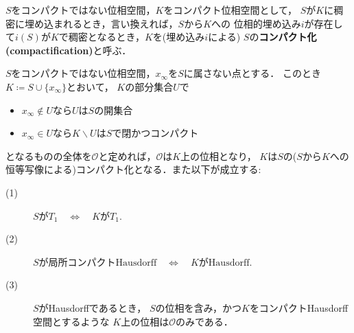 	\begin{screen}
		\begin{dfn}[コンパクト化]
			$S$をコンパクトではない位相空間，$K$をコンパクト位相空間として，
			$S$が$K$に稠密に埋め込まれるとき，言い換えれば，$S$から$K$への
			位相的埋め込み$i$が存在して$i(S)$が$K$で稠密となるとき，$K$を(埋め込み$i$による)
			$S$の{\bf コンパクト化}
			{\bf (compactification)}と呼ぶ．
		\end{dfn}
	\end{screen}
	
	\begin{screen}
		\begin{thm}
		\label{thm:Alexandroff_compactification}
			$S$をコンパクトではない位相空間，$x_\infty$を$S$に属さない点とする．
			このとき$K \coloneqq S \cup \{x_\infty\}$とおいて，
			$K$の部分集合$U$で
			\begin{itemize}
				\item $x_\infty \notin U$なら$U$は$S$の開集合
				\item $x_\infty \in U$なら$K \backslash U$は$S$で閉かつコンパクト
			\end{itemize}
			となるものの全体を$\mathscr{O}$と定めれば，$\mathscr{O}$は$K$上の位相となり，
			$K$は$S$の($S$から$K$への恒等写像による)コンパクト化となる．また以下が成立する:
			\begin{description}
				\item[(1)] $\mbox{$S$が$T_1$} \quad 
					\Longleftrightarrow \quad \mbox{$K$が$T_1$}$.
					
				\item[(2)] $\mbox{$S$が局所コンパクトHausdorff} \quad 
					\Longleftrightarrow \quad \mbox{$K$がHausdorff}$.
					
				\item[(3)] $S$がHausdorffであるとき，
					$S$の位相を含み，かつ$K$をコンパクトHausdorff空間とするような
					$K$上の位相は$\mathscr{O}$のみである．
			\end{description}
		\end{thm}
	\end{screen}
	
